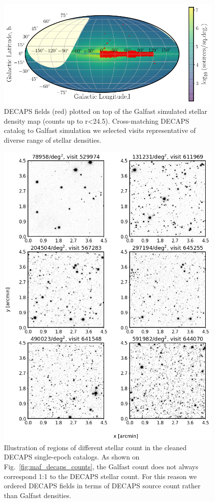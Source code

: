 \documentclass[DM,lsstdraft,toc,usenatbib]{lsstdoc}
\begin{document}
\begin{figure}

\includegraphics[width=1.0\columnwidth]{figs/MAF_DECAPS.png}
\caption{DECAPS fields (red) plotted on top of the Galfast simulated stellar density map (counts up to r<24.5). Cross-matching DECAPS catalog to Galfast simulation we selected visits representative of diverse range of stellar densities.}
\label{fig:decaps_fields}
\end{figure} 


\begin{figure}
\begin{centering}
\includegraphics[width=0.85\columnwidth]{figs/Illustrate_densities_DECAPS.png}
\vskip -0.15in
\caption{Illustration of regions of different stellar count in the cleaned DECAPS single-epoch catalogs. As shown on Fig.~\ref{fig:maf_decaps_counts}, the Galfast count does not always correspond 1:1 to the DECAPS stellar count. For this reason we ordered DECAPS fields in terms of DECAPS source count rather than Galfast densities.}
\label{fig:decaps_illustrate}
\end{centering}
\end{figure} 
\end{document}
